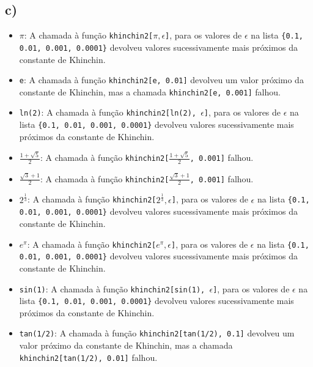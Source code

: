 \documentclass[12pt,a4paper]{article}
\begin{document}
    
    \subsection{c)}
        \begin{itemize}
            \item \(\pi\): A chamada à função \texttt{khinchin2[\(\pi, \epsilon\)]}, para os valores de \(\epsilon\) na lista \texttt{\{0.1, 0.01, 0.001, 0.0001\}} devolveu valores sucessivamente mais próximos da constante de Khinchin.
            \item \texttt{e}: A chamada à função \texttt{khinchin2[e, 0.01]} devolveu um valor próximo da constante de Khinchin, mas a chamada \texttt{khinchin2[e, 0.001]} falhou.
            \item \texttt{ln(2)}: A chamada à função \texttt{khinchin2[ln(2), \(\epsilon\)]}, para os valores de \(\epsilon\) na lista \texttt{\{0.1, 0.01, 0.001, 0.0001\}} devolveu valores sucessivamente mais próximos da constante de Khinchin.
            \item \(\frac{1+\sqrt{5}}{2}\): A chamada à função \texttt{khinchin2[\(\frac{1+\sqrt{5}}{2}\), 0.001]} falhou.
            \item \(\frac{\sqrt{3}+1}{2}\): A chamada à função \texttt{khinchin2[\(\frac{\sqrt{3}+1}{2}\), 0.001]} falhou.
            \item \(2^{\frac{1}{3}}\): A chamada à função \texttt{khinchin2[\(2^{\frac{1}{3}}, \epsilon\)]}, para os valores de \(\epsilon\) na lista \texttt{\{0.1, 0.01, 0.001, 0.0001\}} devolveu valores sucessivamente mais próximos da constante de Khinchin.
            \item \(e^\pi\): A chamada à função \texttt{khinchin2[\(e^\pi, \epsilon\)]}, para os valores de \(\epsilon\) na lista \texttt{\{0.1, 0.01, 0.001, 0.0001\}} devolveu valores sucessivamente mais próximos da constante de Khinchin.
            \item \texttt{sin(1)}: A chamada à função \texttt{khinchin2[sin(1), \(\epsilon\)]}, para os valores de \(\epsilon\) na lista \texttt{\{0.1, 0.01, 0.001, 0.0001\}} devolveu valores sucessivamente mais próximos da constante de Khinchin.
            \item \texttt{tan(1/2)}: A chamada à função \texttt{khinchin2[tan(1/2), 0.1]} devolveu um valor próximo da constante de Khinchin, mas a chamada \texttt{khinchin2[tan(1/2), 0.01]} falhou.
        \end{itemize}
\end{document}
